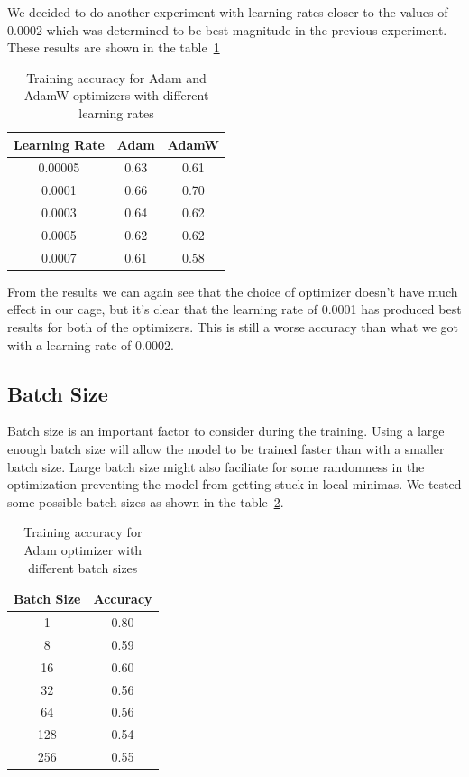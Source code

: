 \documentclass[12pt,a4paper,english
]{tunithesis}
\begin{document}
We decided to do another experiment with learning rates closer to the values of $0.0002$ which was determined to be best magnitude in the previous experiment. These results are shown in the table~\ref{tab:learningrates2}

\begin{table}[h!]
\centering
\caption{Training accuracy for Adam and AdamW optimizers with different learning rates}
\begin{tabular}{|c|c|c|}
\hline
\textbf{Learning Rate} & \textbf{Adam} & \textbf{AdamW} \\ \hline
0.00005 & 0.63 & 0.61 \\ \hline
0.0001 & 0.66 & 0.70 \\ \hline
0.0003 & 0.64 & 0.62 \\ \hline
0.0005 & 0.62 & 0.62 \\ \hline
0.0007 & 0.61 & 0.58 \\ \hline
\end{tabular}
\label{tab:learningrates2}
\end{table}


From the results we can again see that the choice of optimizer doesn't have much effect in our cage, but it's clear that the learning rate of 0.0001 has produced best results for both of the optimizers. This is still a worse accuracy than what we got with a learning rate of 0.0002.

\subsection{Batch Size}
Batch size is an important factor to consider during the training. Using a large enough batch size will allow the model to be trained faster than with a smaller batch size. Large batch size might also faciliate for some randomness in the optimization preventing the model from getting stuck in local minimas. We tested some possible batch sizes as shown in the table~\ref{tab:batchsizes}.
\begin{table}[h!]
\centering
\caption{Training accuracy for Adam optimizer with different batch sizes}
\begin{tabular}{|c|c|}
\hline
\textbf{Batch Size} & \textbf{Accuracy} \\ \hline
1 & 0.80 \\ \hline
8 & 0.59 \\ \hline
16 & 0.60 \\ \hline
32 & 0.56 \\ \hline
64 & 0.56 \\ \hline
128 & 0.54 \\ \hline
256 & 0.55 \\ \hline
\end{tabular}
\label{tab:batchsizes}
\end{table}
\end{document}
